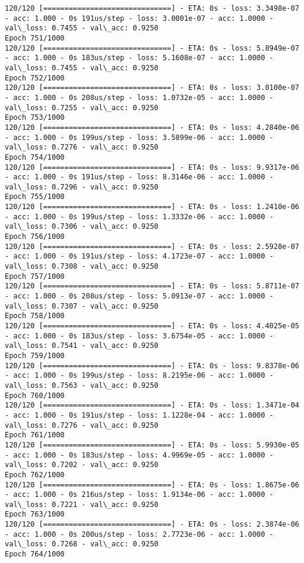 \documentclass[11pt]{article}
\begin{document}
\begin{Verbatim}[commandchars=\\\{\}]
120/120 [==============================] - ETA: 0s - loss: 3.3498e-07 - acc: 1.000 - 0s 191us/step - loss: 3.0001e-07 - acc: 1.0000 - val\_loss: 0.7455 - val\_acc: 0.9250
Epoch 751/1000
120/120 [==============================] - ETA: 0s - loss: 5.8949e-07 - acc: 1.000 - 0s 183us/step - loss: 5.1608e-07 - acc: 1.0000 - val\_loss: 0.7455 - val\_acc: 0.9250
Epoch 752/1000
120/120 [==============================] - ETA: 0s - loss: 3.0100e-07 - acc: 1.000 - 0s 208us/step - loss: 1.0732e-05 - acc: 1.0000 - val\_loss: 0.7255 - val\_acc: 0.9250
Epoch 753/1000
120/120 [==============================] - ETA: 0s - loss: 4.2840e-06 - acc: 1.000 - 0s 199us/step - loss: 3.5899e-06 - acc: 1.0000 - val\_loss: 0.7276 - val\_acc: 0.9250
Epoch 754/1000
120/120 [==============================] - ETA: 0s - loss: 9.9317e-06 - acc: 1.000 - 0s 191us/step - loss: 8.3146e-06 - acc: 1.0000 - val\_loss: 0.7296 - val\_acc: 0.9250
Epoch 755/1000
120/120 [==============================] - ETA: 0s - loss: 1.2410e-06 - acc: 1.000 - 0s 199us/step - loss: 1.3332e-06 - acc: 1.0000 - val\_loss: 0.7306 - val\_acc: 0.9250
Epoch 756/1000
120/120 [==============================] - ETA: 0s - loss: 2.5928e-07 - acc: 1.000 - 0s 191us/step - loss: 4.1723e-07 - acc: 1.0000 - val\_loss: 0.7308 - val\_acc: 0.9250
Epoch 757/1000
120/120 [==============================] - ETA: 0s - loss: 5.8711e-07 - acc: 1.000 - 0s 208us/step - loss: 5.0913e-07 - acc: 1.0000 - val\_loss: 0.7307 - val\_acc: 0.9250
Epoch 758/1000
120/120 [==============================] - ETA: 0s - loss: 4.4025e-05 - acc: 1.000 - 0s 183us/step - loss: 3.6754e-05 - acc: 1.0000 - val\_loss: 0.7541 - val\_acc: 0.9250
Epoch 759/1000
120/120 [==============================] - ETA: 0s - loss: 9.8378e-06 - acc: 1.000 - 0s 199us/step - loss: 8.2195e-06 - acc: 1.0000 - val\_loss: 0.7563 - val\_acc: 0.9250
Epoch 760/1000
120/120 [==============================] - ETA: 0s - loss: 1.3471e-04 - acc: 1.000 - 0s 191us/step - loss: 1.1228e-04 - acc: 1.0000 - val\_loss: 0.7276 - val\_acc: 0.9250
Epoch 761/1000
120/120 [==============================] - ETA: 0s - loss: 5.9930e-05 - acc: 1.000 - 0s 183us/step - loss: 4.9969e-05 - acc: 1.0000 - val\_loss: 0.7202 - val\_acc: 0.9250
Epoch 762/1000
120/120 [==============================] - ETA: 0s - loss: 1.8675e-06 - acc: 1.000 - 0s 216us/step - loss: 1.9134e-06 - acc: 1.0000 - val\_loss: 0.7221 - val\_acc: 0.9250
Epoch 763/1000
120/120 [==============================] - ETA: 0s - loss: 2.3874e-06 - acc: 1.000 - 0s 200us/step - loss: 2.7723e-06 - acc: 1.0000 - val\_loss: 0.7268 - val\_acc: 0.9250
Epoch 764/1000

\end{Verbatim}
\end{document}
